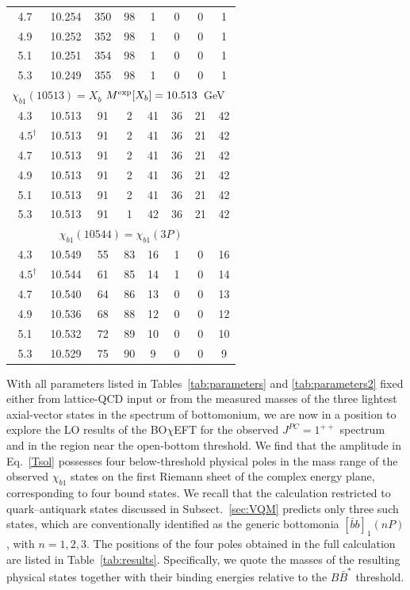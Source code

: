 \documentclass[aps,prd,showpacs,amsmath,twocolumn,superscriptaddress,floatfix,nofootinbib,notitlepage]{revtex4-2}
\newcommand{\bbnP}{[\bar{b}b]_1(nP)}
\newcommand{\Xb}{X_b}
\newcommand{\BOchiEFT}{BO$\chi$EFT\xspace}
\begin{document}
\begin{table}[t!]
\begin{ruledtabular}
\begin{tabular}{c|c|c|c|c|c|c|c}
4.7 & 10.254 & 350 & 98 & 1 & 0 & 0 & 1 \\
4.9 & 10.252 & 352 & 98 & 1 & 0 & 0 & 1 \\
5.1 & 10.251 & 354 & 98 & 1 & 0 & 0 & 1 \\
5.3 & 10.249 & 355 & 98 & 1 & 0 & 0 & 1 \\
\hline
\multicolumn{8}{c}{$\chi_{b1}(10513)=\Xb$
\quad
$M^{\rm exp}[\Xb]=10.513$~GeV~\cite{ParticleDataGroup:2026mpi}
} \\
\hline
4.3 & 10.513 & 91 & 2 & 41 & 36 & 21 & 42 \\
~$4.5^\dagger$ & 10.513 & 91 & 2 & 41 & 36 & 21 & 42 \\
4.7 & 10.513 & 91 & 2 & 41 & 36 & 21 & 42 \\
4.9 & 10.513 & 91 & 2 & 41 & 36 & 21 & 42 \\
5.1 & 10.513 & 91 & 2 & 41 & 36 & 21 & 42 \\
5.3 & 10.513 & 91 & 1 & 42 & 36 & 21 & 42 \\
\hline
\multicolumn{8}{c}{$\chi_{b1}(10544)=\chi_{b1}(3P)$} \\
\hline
4.3 & 10.549 & 55 & 83 & 16 & 1 & 0 & 16 \\
~$4.5^\dagger$ & 10.544 & 61 & 85 & 14 & 1 & 0 & 14 \\
4.7 & 10.540 & 64 & 86 & 13 & 0 & 0 & 13 \\
4.9 & 10.536 & 68 & 88 & 12 & 0 & 0 & 12 \\
5.1 & 10.532 & 72 & 89 & 10 & 0 & 0 & 10 \\
5.3 & 10.529 & 75 & 90 & 9 & 0 & 0 & 9
\end{tabular}
\end{ruledtabular}
\end{table}
 
With all parameters listed in Tables~\ref{tab:parameters} and \ref{tab:parameters2} fixed either from lattice-QCD input or from the measured masses of the three lightest axial-vector states in the spectrum of bottomonium, we are now in a position to explore the LO results
of the \BOchiEFT for the observed $J^{PC}=1^{++}$ spectrum and in the region near the open-bottom threshold. We find that the amplitude in Eq.~\eqref{Tsol} possesses four below-threshold physical poles in the mass range of the observed $\chi_{b1}$ states on the first Riemann sheet of the complex energy plane, corresponding to four bound states. We recall that the calculation restricted to quark--antiquark states discussed in Subsect.~\ref{sec:VQM} predicts only three such states, which are conventionally identified 
as the generic bottomonia $\bbnP$, with $n=1,2,3$. 
The positions of the four poles obtained in the full calculation are listed in Table~\ref{tab:results}. Specifically, we quote the masses of the resulting physical states together with their binding energies relative to the $B\bar{B}^*$ threshold.
\end{document}
